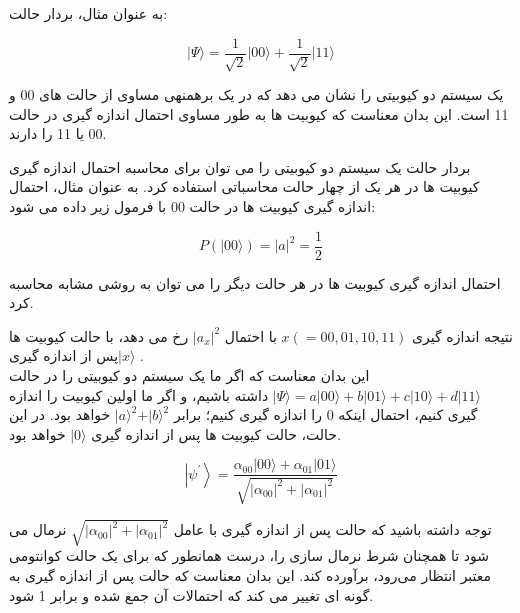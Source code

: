 \documentclass{book}
\begin{document}
به عنوان مثال، بردار حالت:

\begin{center}
	\begin{equation}
\vert \Psi \rangle = \frac{1}{\sqrt{2}} \vert00\rangle + \frac{1}{\sqrt{2}} \vert11\rangle
	\end{equation}
\end{center}

یک سیستم دو کیوبیتی را نشان می دهد که در یک برهمنهی مساوی از حالت های 00 و 11 است. این بدان معناست که کیوبیت ها به طور مساوی احتمال اندازه گیری در حالت 00 یا 11 را دارند.

بردار حالت یک سیستم دو کیوبیتی را می توان برای محاسبه احتمال اندازه گیری کیوبیت ها در هر یک از چهار حالت محاسباتی استفاده کرد. به عنوان مثال، احتمال اندازه گیری کیوبیت ها در حالت 00 با فرمول زیر داده می شود:
\begin{center}\label{possible value}
\begin{equation}
	P(\vert00\rangle) = \vert a\vert^ 2 = \frac{1}{2}
\end{equation}
\end{center}


احتمال اندازه گیری کیوبیت ها در هر حالت دیگر را می توان به روشی مشابه محاسبه کرد.

نتیجه اندازه گیری $x (= 00, 01, 10 , 11)$ با احتمال $\vert a_{x} \vert ^ 2$ رخ می دهد، با حالت کیوبیت ها پس از اندازه گیری$\vert x \rangle$ .\\
 این بدان معناست که اگر ما یک سیستم دو کیوبیتی را در حالت
$\vert \Psi \rangle = a \vert00\rangle + b \vert01\rangle + c \vert10\rangle + d \vert11\rangle $ 
داشته باشیم، و اگر ما اولین کیوبیت را اندازه گیری کنیم، احتمال اینکه 0 را اندازه گیری کنیم؛ برابر $\vert a \rangle^2 + \vert b \rangle ^ 2$ خواهد بود. در این حالت، حالت کیوبیت ها پس از اندازه گیری $\vert 0 \rangle$ خواهد بود.




\begin{center}
	\begin{equation}\label{psi after mesurment}
		\left|\psi^{\prime}\right\rangle=\frac{\alpha_{00}|00\rangle+\alpha_{01}|01\rangle}{\sqrt{\left|\alpha_{00}\right|^2+\left|\alpha_{01}\right|^2}}
	\end{equation}
\end{center}
توجه داشته باشید که حالت پس از اندازه گیری با عامل $\sqrt{|{α}_{00}|^2 + |{α}_{01}|^2}$ نرمال می شود
تا همچنان شرط نرمال سازی را، درست همانطور که برای یک
حالت کوانتومی معتبر انتظار می‌‌رود، برآورده کند. این بدان معناست که حالت پس از اندازه گیری به گونه ای تغییر می کند که احتمالات آن جمع شده و برابر 1 شود.
\end{document}
